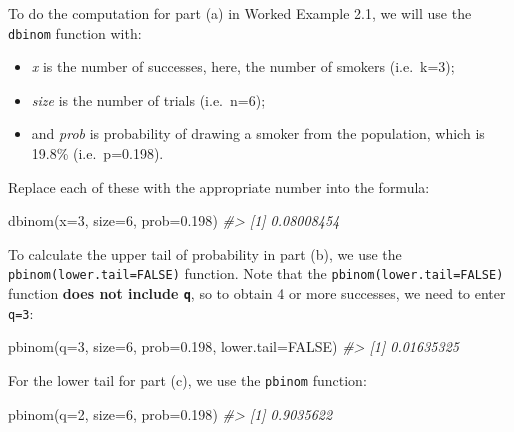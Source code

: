\documentclass[
]{memoir}
\newenvironment{Shaded}{\begin{snugshade}}{\end{snugshade}}
\newcommand{\AttributeTok}[1]{\textcolor[rgb]{0.77,0.63,0.00}{#1}}
\newcommand{\CommentTok}[1]{\textcolor[rgb]{0.56,0.35,0.01}{\textit{#1}}}
\newcommand{\ConstantTok}[1]{\textcolor[rgb]{0.00,0.00,0.00}{#1}}
\newcommand{\DecValTok}[1]{\textcolor[rgb]{0.00,0.00,0.81}{#1}}
\newcommand{\FloatTok}[1]{\textcolor[rgb]{0.00,0.00,0.81}{#1}}
\newcommand{\FunctionTok}[1]{\textcolor[rgb]{0.00,0.00,0.00}{#1}}
\newcommand{\NormalTok}[1]{#1}
\providecommand{\tightlist}{%
  \setlength{\itemsep}{0pt}\setlength{\parskip}{0pt}}
\begin{document}
To do the computation for part (a) in Worked Example 2.1, we will use the \texttt{dbinom} function with:

\begin{itemize}
\tightlist
\item
  \emph{x} is the number of successes, here, the number of smokers (i.e.~k=3);
\item
  \emph{size} is the number of trials (i.e.~n=6);
\item
  and \emph{prob} is probability of drawing a smoker from the population, which is 19.8\% (i.e.~p=0.198).
\end{itemize}

Replace each of these with the appropriate number into the formula:

\begin{Shaded}
\begin{Highlighting}[]
\FunctionTok{dbinom}\NormalTok{(}\AttributeTok{x=}\DecValTok{3}\NormalTok{, }\AttributeTok{size=}\DecValTok{6}\NormalTok{, }\AttributeTok{prob=}\FloatTok{0.198}\NormalTok{)}
\CommentTok{\#\textgreater{} [1] 0.08008454}
\end{Highlighting}
\end{Shaded}

To calculate the upper tail of probability in part (b), we use the \texttt{pbinom(lower.tail=FALSE)} function. Note that the \texttt{pbinom(lower.tail=FALSE)} function \textbf{does not include \texttt{q}}, so to obtain 4 or more successes, we need to enter \texttt{q=3}:

\begin{Shaded}
\begin{Highlighting}[]
\FunctionTok{pbinom}\NormalTok{(}\AttributeTok{q=}\DecValTok{3}\NormalTok{, }\AttributeTok{size=}\DecValTok{6}\NormalTok{, }\AttributeTok{prob=}\FloatTok{0.198}\NormalTok{, }\AttributeTok{lower.tail=}\ConstantTok{FALSE}\NormalTok{)}
\CommentTok{\#\textgreater{} [1] 0.01635325}
\end{Highlighting}
\end{Shaded}

For the lower tail for part (c), we use the \texttt{pbinom} function:

\begin{Shaded}
\begin{Highlighting}[]
\FunctionTok{pbinom}\NormalTok{(}\AttributeTok{q=}\DecValTok{2}\NormalTok{, }\AttributeTok{size=}\DecValTok{6}\NormalTok{, }\AttributeTok{prob=}\FloatTok{0.198}\NormalTok{)}
\CommentTok{\#\textgreater{} [1] 0.9035622}
\end{Highlighting}
\end{Shaded}
\end{document}
